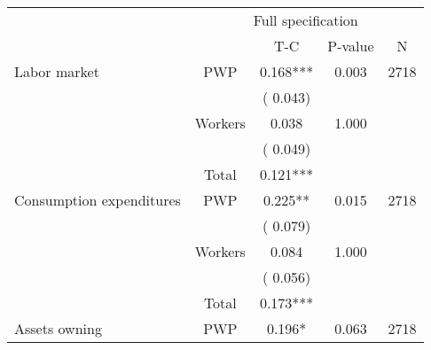 
\begin{tabular}{l*{4}{c}}\hline&\multicolumn{4}{c}{Full specification} \\ \cmidrule(r){2-5} & {} & {T-C} & {P-value} & {N}  \\ \midrule
 Labor market                 &       PWP     &              0.168***                 &        0.003    & 2718                               \\  
                               &                               &       (       0.043)                              & &                                                                             \\ 
                               &       Workers         &              0.038                 &        1.000    &                                               \\ 
                               &                               &       (       0.049)                              & &                                                                             \\ 
\cmidrule{2-3}
                               &       Total           &              0.121***                 &    &                                               \\ 
\cmidrule{2-3}
 Consumption expenditures                 &       PWP     &              0.225**                 &        0.015    & 2718                               \\ 
                               &                               &       (       0.079)                              & &                                                                             \\ 
                               &       Workers         &              0.084                 &        1.000    &                                               \\ 
                               &                               &       (       0.056)                              & &                                                                             \\ 
\cmidrule{2-3}
                               &       Total           &              0.173***                 &    &                                               \\ 
\cmidrule{2-3}
 Assets owning                 &       PWP     &              0.196*                 &        0.063    & 2718                               \\ 

\end{tabular}
